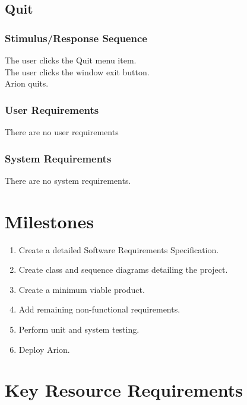 \documentclass{scrreprt}
\begin{document}
\section{Quit}
    \subsection*{Stimulus/Response Sequence}
        \begin{flushleft}
             The user clicks the Quit menu item. \\
             The user clicks the window exit button. \\
             Arion quits. \\
        \end{flushleft}

    \subsection*{User Requirements}
    There are no user requirements

    \subsection*{System Requirements}
    There are no system requirements.


\chapter{Milestones}
    \begin{enumerate}[1.]
        \item Create a detailed Software Requirements Specification.
        \item Create class and sequence diagrams detailing the project.
        \item Create a minimum viable product.
        \item Add remaining non-functional requirements.
        \item Perform unit and system testing.
        \item Deploy Arion.
    \end{enumerate}


\chapter{Key Resource Requirements}
\end{document}
